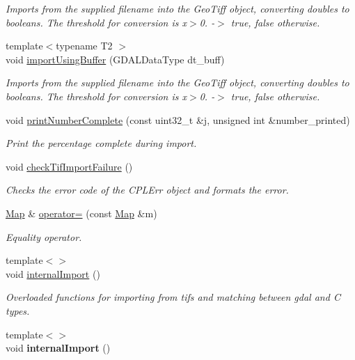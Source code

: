 \begin{DoxyCompactItemize}
\begin{DoxyCompactList}\small\item\em Imports from the supplied filename into the Geo\+Tiff object, converting doubles to booleans. The threshold for conversion is x$>$0. -\/$>$ true, false otherwise. \end{DoxyCompactList}\item 
{\footnotesize template$<$typename T2 $>$ }\\void \hyperlink{class_map_ae88574927ad3a38fc0a9bc253a9e4a7a}{import\+Using\+Buffer} (G\+D\+A\+L\+Data\+Type dt\+\_\+buff)
\begin{DoxyCompactList}\small\item\em Imports from the supplied filename into the Geo\+Tiff object, converting doubles to booleans. The threshold for conversion is x$>$0. -\/$>$ true, false otherwise. \end{DoxyCompactList}\item 
void \hyperlink{class_map_a03e0486e704090765d253b18a9dde0f5}{print\+Number\+Complete} (const uint32\+\_\+t \&j, unsigned int \&number\+\_\+printed)
\begin{DoxyCompactList}\small\item\em Print the percentage complete during import. \end{DoxyCompactList}\item 
void \hyperlink{class_map_a6387185da6dc3063cd2311ffab0a5fba}{check\+Tif\+Import\+Failure} ()\hypertarget{class_map_a6387185da6dc3063cd2311ffab0a5fba}{}\label{class_map_a6387185da6dc3063cd2311ffab0a5fba}

\begin{DoxyCompactList}\small\item\em Checks the error code of the C\+P\+L\+Err object and formats the error. \end{DoxyCompactList}\item 
\hyperlink{class_map}{Map} \& \hyperlink{class_map_a00f73ad13cb67e3c4836fae9614d6b40}{operator=} (const \hyperlink{class_map}{Map} \&m)
\begin{DoxyCompactList}\small\item\em Equality operator. \end{DoxyCompactList}\item 
{\footnotesize template$<$$>$ }\\void \hyperlink{class_map_aad03012fb1c3e434747e62804f3149e9}{internal\+Import} ()
\begin{DoxyCompactList}\small\item\em Overloaded functions for importing from tifs and matching between gdal and C types. \end{DoxyCompactList}\item 
{\footnotesize template$<$$>$ }\\void {\bfseries internal\+Import} ()\hypertarget{class_map_a32564b4934b1523465e5e3d7145af8f3}{}\label{class_map_a32564b4934b1523465e5e3d7145af8f3}


\end{DoxyCompactItemize}
